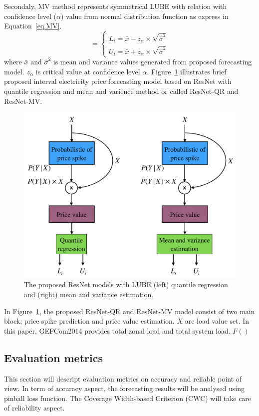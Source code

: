 \documentclass[review]{elsarticle}
\begin{document}
      Secondaly, MV method represents symmetrical LUBE with relation with confidence level ($\alpha$) value from normal distribution function as express in Equation~\ref{eq.MV}.
      \begin{equation}
        [L_{i}, U_{i}]=
        \begin{cases}
          L_{i}=\bar{x} - z_{\alpha} \times \sqrt{\hat{\sigma}^2}\\
          U_{i}=\bar{x} + z_{\alpha} \times \sqrt{\hat{\sigma}^2}
        \end{cases}
        \label{eq.MV}
      \end{equation}
      where $\bar{x}$ and $\hat{\sigma}^2$ is mean and variance values generated from proposed forecasting model. $z_{\alpha}$ is critical value at confidence level $\alpha$.
      Figure~\ref{Fig:UB_LB_MV_PDRNN} illustrates brief proposed interval electricity price forecasting model based on ResNet with quantile regression and mean and varience method or called ResNet-QR and ResNet-MV.
      \begin{figure}[H]
        \includegraphics[width=12cm]{UB_LB_MV_PDRNN}
        \caption{The proposed ResNet models with LUBE (left) quantile regression and (right) mean and variance estimation.}
        \label{Fig:UB_LB_MV_PDRNN}
        \centering
      \end{figure}
      In Figure~\ref{Fig:UB_LB_MV_PDRNN}, the proposed ResNet-QR and ResNet-MV model consist of two main block; price spike prediction and price value estimation. $X$ are load value set. In this paper, GEFCom2014 provides total zonal load and total system load. $F()$

    \subsection{Evaluation metrics}
      This section will descript evaluation metrics on accuracy and reliable point of view.
      In term of accuracy aspect, the forecasting results will be analysed using pinball loss function.
      The Coverage Width-based Criterion (CWC) will take care of reliability aspect.
\end{document}
